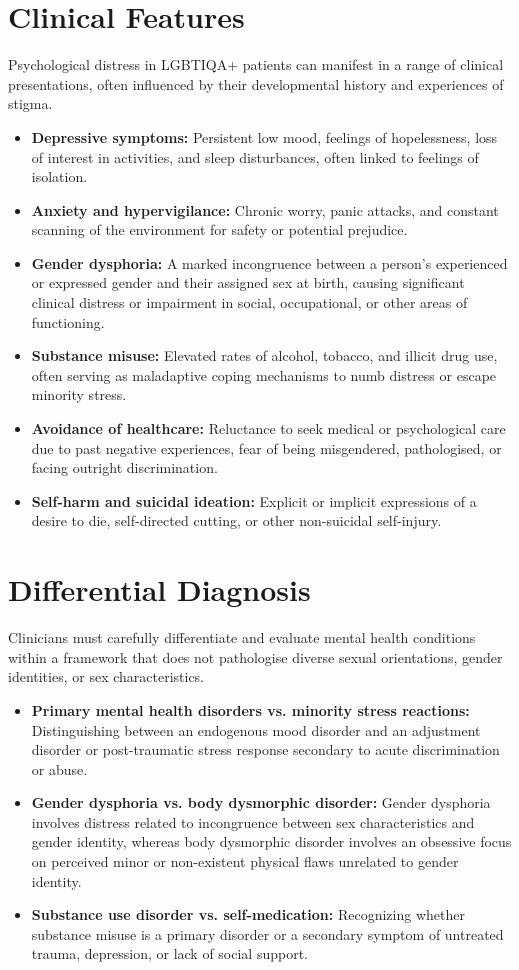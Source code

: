 \section*{Clinical Features}
Psychological distress in LGBTIQA+ patients can manifest in a range of clinical presentations, often influenced by their developmental history and experiences of stigma.
\begin{itemize}
    \item \textbf{Depressive symptoms:} Persistent low mood, feelings of hopelessness, loss of interest in activities, and sleep disturbances, often linked to feelings of isolation.
    \item \textbf{Anxiety and hypervigilance:} Chronic worry, panic attacks, and constant scanning of the environment for safety or potential prejudice.
    \item \textbf{Gender dysphoria:} A marked incongruence between a person's experienced or expressed gender and their assigned sex at birth, causing significant clinical distress or impairment in social, occupational, or other areas of functioning.
    \item \textbf{Substance misuse:} Elevated rates of alcohol, tobacco, and illicit drug use, often serving as maladaptive coping mechanisms to numb distress or escape minority stress.
    \item \textbf{Avoidance of healthcare:} Reluctance to seek medical or psychological care due to past negative experiences, fear of being misgendered, pathologised, or facing outright discrimination.
    \item \textbf{Self-harm and suicidal ideation:} Explicit or implicit expressions of a desire to die, self-directed cutting, or other non-suicidal self-injury.
\end{itemize}

\section*{Differential Diagnosis}
Clinicians must carefully differentiate and evaluate mental health conditions within a framework that does not pathologise diverse sexual orientations, gender identities, or sex characteristics.
\begin{itemize}
    \item \textbf{Primary mental health disorders vs. minority stress reactions:} Distinguishing between an endogenous mood disorder and an adjustment disorder or post-traumatic stress response secondary to acute discrimination or abuse.
    \item \textbf{Gender dysphoria vs. body dysmorphic disorder:} Gender dysphoria involves distress related to incongruence between sex characteristics and gender identity, whereas body dysmorphic disorder involves an obsessive focus on perceived minor or non-existent physical flaws unrelated to gender identity.
    \item \textbf{Substance use disorder vs. self-medication:} Recognizing whether substance misuse is a primary disorder or a secondary symptom of untreated trauma, depression, or lack of social support.
\end{itemize}


